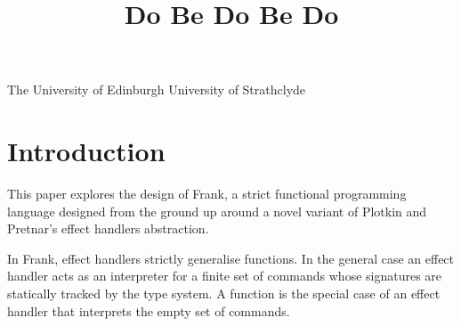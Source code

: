 \documentclass[preprint]{sigplanconf}
\begin{document}


\title{Do Be Do Be Do}

           {The University of Edinburgh}
           {}
           {University of Strathclyde}
           {}

\maketitle



\section{Introduction}

This paper explores the design of Frank, a strict functional
programming language designed from the ground up around a novel
variant of Plotkin and Pretnar's effect handlers abstraction.

In Frank, effect handlers strictly generalise functions. In the
general case an effect handler acts as an interpreter for a finite set
of commands whose signatures are statically tracked by the type
system. A function is the special case of an effect handler that
interprets the empty set of commands.
\end{document}
